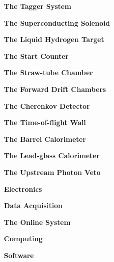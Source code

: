  
\clearpage
\begin{center}\textbf{The Tagger System}\end{center}

\clearpage
\begin{center}\textbf{The Superconducting Solenoid}\end{center}

\clearpage
\begin{center}\textbf{The Liquid Hydrogen Target}\end{center}

\clearpage
\begin{center}\textbf{The Start Counter}\end{center}

\clearpage
\begin{center}\textbf{The Straw-tube Chamber}\end{center}

\clearpage
\begin{center}\textbf{The Forward Drift Chambers}\end{center}

\clearpage
\begin{center}\textbf{The Cherenkov Detector}\end{center}

\clearpage
%
\begin{center}\textbf{The Time-of-flight Wall}\end{center}

\clearpage
\begin{center}\textbf{The Barrel Calorimeter}\end{center}

\clearpage
\begin{center}\textbf{The Lead-glass Calorimeter}\end{center}

\clearpage
\begin{center}\textbf{The Upstream Photon Veto}\end{center}

\clearpage
\begin{center}\textbf{Electronics}\end{center}

\clearpage
\begin{center}\textbf{Data Acquisition}\end{center}

\clearpage
\begin{center}\textbf{The Online System}\end{center}

\clearpage
\begin{center}\textbf{Computing}\end{center}

\clearpage
\begin{center}\textbf{Software}\end{center}



